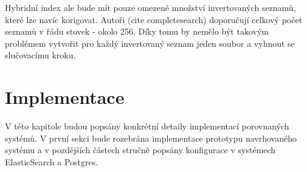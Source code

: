 \documentclass[11pt,letterpaper,oneside,openright]{book}
\begin{document}

Hybridní index ale bude mít pouze omezené množství invertovaných seznamů, které
lze navíc korigovat. Autoři (cite completesearch) doporučují celkový počet
seznamů v řádu stovek - okolo 256. Díky tomu by nemělo být takovým problémem
vytvořit pro každý invertovaný seznam jeden soubor a vyhnout se slučovacímu
kroku.


\chapter{Implementace}
%
%

V této kapitole budou popsány konkrétní detaily implementací porovnaných
systémů. V první sekci bude rozebrána implementace prototypu navrhovaného
systému a v pozdějších částech stručně popsány konfigurace v systémech
ElasticSearch a Postgres.
\end{document}
